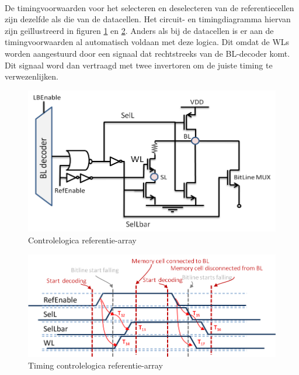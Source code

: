 \paragraph{}
De timingvoorwaarden voor het selecteren en deselecteren van de referentiecellen zijn dezelfde als die van de datacellen. Het circuit- en timingdiagramma hiervan zijn geïllustreerd in figuren \ref{fig:lbref_timing1} en \ref{fig:lbref_timing2}. Anders als bij de datacellen is er aan de timingvoorwaarden al automatisch voldaan met deze logica. Dit omdat de WLs worden aangestuurd door een signaal dat rechtstreeks van de BL-decoder komt. Dit signaal word dan vertraagd met twee invertoren om de juiste timing te verwezenlijken.


\begin{figure}[!ht]
  \centering
  \includegraphics[scale=0.6]{../fig/hfdstk-timing-lbref1.png}
  \caption[Referentie-array:logica]{Controlelogica referentie-array}
  \label{fig:lbref_timing1}
\end{figure}

\begin{figure}[!ht]
  \centering
  \includegraphics[scale=0.9]{../fig/hfdstk-timing-lbref2.png}
  \caption[Referentie-array:timing]{Timing controlelogica referentie-array}
  \label{fig:lbref_timing2}
\end{figure}

